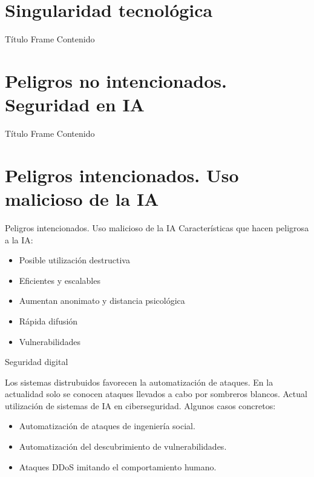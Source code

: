 \documentclass{beamer}
\begin{document}
\section{Singularidad tecnológica}
\begin{frame}{Título Frame}
Contenido
\end{frame}

\section{Peligros no intencionados. Seguridad en IA}
\begin{frame}{Título Frame}
Contenido
\end{frame}

\section{Peligros intencionados. Uso malicioso de la IA}
\begin{frame}{Peligros intencionados. Uso malicioso de la IA}
Características que hacen peligrosa a la IA:

\begin{itemize}
\item Posible utilización destructiva
\item Eficientes y escalables
\item Aumentan anonimato y distancia psicológica
\item Rápida difusión
\item Vulnerabilidades
\end{itemize}

\end{frame}

\begin{frame}{Seguridad digital}

Los sistemas distrubuidos favorecen la automatización de ataques.
\newline
\newline
En la actualidad solo se conocen ataques llevados a cabo por sombreros blancos.
\newline
\newline
Actual utilización de sistemas de IA en ciberseguridad.
\newline
\newline
Algunos casos concretos:
\begin{itemize}
\item Automatización de ataques de ingeniería social.
\item Automatización del descubrimiento de vulnerabilidades.
\item Ataques DDoS imitando el comportamiento humano.
\end{itemize}

\end{frame}
\end{document}
